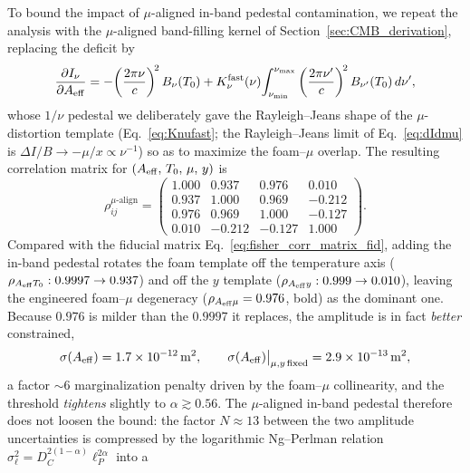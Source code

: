 \documentclass[aps,prd,onecolumn,amsmath,amssymb]{revtex4-2}
\begin{document}
To bound the impact of $\mu$-aligned in-band pedestal contamination, we
repeat the analysis with the $\mu$-aligned band-filling kernel of
Section~\ref{sec:CMB_derivation}, replacing the deficit by
\begin{equation}
  \frac{\partial I_\nu}{\partial A_{\rm eff}}
    = -\!\left(\frac{2\pi\nu}{c}\right)^{\!2} B_\nu(T_0)
      + K_\nu^{\rm fast}(\nu)\!\int_{\nu_{\rm min}}^{\nu_{\rm max}}
        \left(\frac{2\pi\nu'}{c}\right)^{\!2} B_{\nu'}(T_0)\,d\nu',
  \label{eq:dIdA}
\end{equation}
whose $1/\nu$ pedestal we deliberately gave the Rayleigh--Jeans shape
of the $\mu$-distortion template (Eq.~\eqref{eq:Knufast}; the
Rayleigh--Jeans limit of Eq.~\eqref{eq:dIdmu} is
$\Delta I/B\to-\mu/x\propto\nu^{-1}$) so as to maximize the foam--$\mu$
overlap.  The resulting correlation matrix for
$(A_{\rm eff},\,T_0,\,\mu,\,y)$ is
\begin{equation}
\rho^{\mu\text{-align}}_{ij} = \begin{pmatrix}
  1.000 & 0.937 & \mathbf{0.976} & 0.010 \\
  0.937 & 1.000 & 0.969 & -0.212 \\
  \mathbf{0.976} & 0.969 & 1.000 & -0.127 \\
  0.010 & -0.212 & -0.127 & 1.000
\end{pmatrix}.
\label{eq:fisher_corr_matrix}
\end{equation}
Compared with the fiducial matrix
Eq.~\eqref{eq:fisher_corr_matrix_fid}, adding the in-band pedestal
rotates the foam template off the temperature axis
($\rho_{A_{\rm eff}T_0}:0.9997\to0.937$) and off the $y$ template
($\rho_{A_{\rm eff}y}:0.999\to0.010$), leaving the engineered
foam--$\mu$ degeneracy ($\rho_{A_{\rm eff}\mu}=0.976$, bold) as the
dominant one.  Because $0.976$ is milder than the $0.9997$ it
replaces, the amplitude is in fact \emph{better} constrained,
\begin{equation}
  \sigma(A_{\rm eff}) = 1.7\times10^{-12}\,{\rm m}^2,
  \qquad
  \sigma(A_{\rm eff})\big|_{\mu,y\,\text{fixed}}
    = 2.9\times10^{-13}\,{\rm m}^2,
  \label{eq:sigma_Aeff_adv}
\end{equation}
a factor $\sim 6$ marginalization penalty driven by the foam--$\mu$
collinearity, and the threshold \emph{tightens} slightly to
$\alpha\gtrsim 0.56$.  The $\mu$-aligned in-band pedestal therefore does
not loosen the bound: the factor $N\approx 13$ between the
two amplitude uncertainties is compressed by the logarithmic Ng--Perlman
relation $\sigma_\ell^2 = D_C^{2(1-\alpha)}\ell_P^{2\alpha}$ into a
\end{document}
